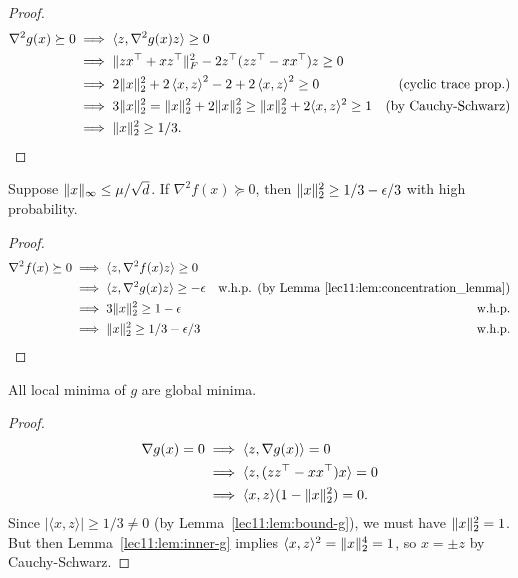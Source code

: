 \begin{proof}
\begin{align}
    \nabla^2 g(x) \succeq 0
    &\implies \langle z, \nabla^2 g(x)z\rangle \geq 0 \\
    &\implies \|zx^\top + xz^\top\|_F^2 - 2z^\top(zz^\top-xx^\top)z \geq 0 \\
    &\implies 2 \|x\|^2_2 + 2 \left\langle x, z\right\rangle^2 - 2 + 2 \left\langle x, z\right\rangle^2 \geq 0 &\text{(cyclic trace prop.)} \\
    &\implies 3\|x\|_2^2 = \|x\|_2^2 + 2\|x\|_2^2 \geq \|x\|_2^2 + 2\langle x,z \rangle^2 \geq 1 &\text{(by Cauchy-Schwarz)} \\
    &\implies \|x\|_2^2 \geq 1/3.
\end{align}
\end{proof}

\begin{lemma}\label{lec11:lem:bound-f}
    Suppose $\|x\|_\infty \leq \mu / \sqrt{d}$. If $\nabla^2 f(x) \succeq 0$, then $\|x\|_2^2 \geq 1/3 - \epsilon/3$ with high probability.
\end{lemma}
\begin{proof}
\begin{align}
    \nabla^2 f(x) \succeq 0
    &\implies \langle z, \nabla^2 f(x)z \rangle \geq 0 \\
    &\implies \langle z, \nabla^2g(x)z \rangle \geq -\epsilon & \text{w.h.p. (by Lemma \ref{lec11:lem:concentration_lemma})} \\
    &\implies 3\|x\|_2^2 \geq 1-\epsilon & \text{w.h.p.} \\
    &\implies \|x\|_2^2 \geq 1/3 - \epsilon/3 & \text{w.h.p.}
\end{align}
\end{proof}

\begin{lemma}
    All local minima of $g$ are global minima.
\end{lemma}

\begin{proof}
\begin{align}
    \nabla g(x) = 0
    & \implies \langle z, \nabla g(x) \rangle = 0 \\
    & \implies \langle z, (zz^\top-xx^\top)x \rangle = 0 \\
    & \implies \langle x,z\rangle (1-\|x\|_2^2) = 0.
\end{align}
Since $|\langle x,z \rangle| \geq 1/3 \neq 0$ (by Lemma~\ref{lec11:lem:bound-g}), we must have $\|x\|_2^2 = 1$. But then Lemma~\ref{lec11:lem:inner-g} implies $\langle x, z\rangle^2 = \|x\|_2^4 = 1$, so $x = \pm z$ by Cauchy-Schwarz.
\end{proof}

